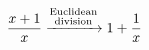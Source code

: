 \documentclass[varwidth, border={5pt 5pt 5pt 5pt}]{standalone}
\newcommand{\twoline}[2]{\overset{\textup{\scriptsize #1}}{\textup{#2}}}
\begin{document}
$$\dfrac{x+1}{x} \xrightarrow{\twoline{Euclidean}{division}} 1+\dfrac{1}{x}$$
\end{document}
